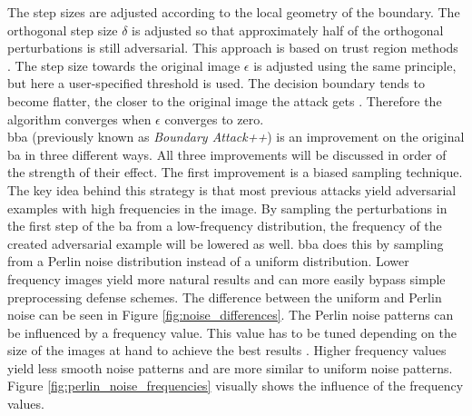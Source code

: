 The step sizes are adjusted according to the local geometry of the boundary. The orthogonal step size $\delta$ is adjusted so that approximately half of the orthogonal perturbations is still adversarial. This approach is based on trust region methods \cite{trm}. The step size towards the original image $\epsilon$ is adjusted using the same principle, but here a user-specified threshold is used. The decision boundary tends to become flatter, the closer to the original image the attack gets \cite{straight_boundaries}. Therefore the algorithm converges when $\epsilon$ converges to zero.\\

\gls{bba} \cite{brunner_guessing_2019} (previously known as \textit{Boundary Attack++}) is an improvement on the original \gls{ba} in three different ways. All three improvements will be discussed in order of the strength of their effect. The first improvement is a biased sampling technique. The key idea behind this strategy is that most previous attacks yield adversarial examples with high frequencies in the image. By sampling the perturbations in the first step of the \gls{ba} from a low-frequency distribution, the frequency of the created adversarial example will be lowered as well. \gls{bba} does this by sampling from a Perlin noise \cite{perlin} distribution instead of a uniform distribution. Lower frequency images yield more natural results and can more easily bypass simple preprocessing defense schemes. The difference between the uniform and Perlin noise can be seen in Figure \ref{fig:noise_differences}. The Perlin noise patterns can be influenced by a frequency value. This value has to be tuned depending on the size of the images at hand to achieve the best results \cite{brunner_guessing_2019}. Higher frequency values yield less smooth noise patterns and are more similar to uniform noise patterns. Figure \ref{fig:perlin_noise_frequencies} visually shows the influence of the frequency values.\\

